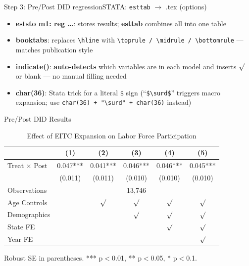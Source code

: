 \documentclass[dvipsnames,hyperref={pdfpagelabels=false}]{beamer}
\begin{document}
\begin{frame}{Step 3: Pre/Post DID regression}{STATA: \texttt{esttab} $\to$ .tex (options)}
\begin{itemize}
    \item \textbf{eststo m1: reg \ldots}: stores results; \textbf{esttab} combines all into one table
    \vspace{0.2cm}
    \item \textbf{booktabs}: replaces \texttt{\textbackslash hline} with
          \texttt{\textbackslash toprule / \textbackslash midrule / \textbackslash bottomrule}
          --- matches publication style
    \vspace{0.2cm}
    \item \textbf{indicate()}: \textbf{auto-detects} which variables are in each model
          and inserts $\surd$ or blank --- no manual filling needed
    \vspace{0.2cm}
    \item \textbf{char(36)}: Stata trick for a literal \texttt{\$} sign
          (``\texttt{\$\textbackslash surd\$}'' triggers macro expansion; use
          \texttt{char(36) + "\textbackslash surd" + char(36)} instead)
\end{itemize}
\end{frame}









\begin{frame}{Pre/Post DID Results}
\vspace{-0.2cm}
\begin{table}[h]
\centering
\footnotesize
\caption{Effect of EITC Expansion on Labor Force Participation}
\begin{tabular}{@{}lccccc@{}}
\toprule
 & (1) & (2) & (3) & (4) & (5) \\
\midrule\midrule
Treat $\times$ Post & 0.047*** & 0.041*** & 0.046*** & 0.046*** & 0.045*** \\
                   & (0.011)  & (0.011)  & (0.010)  & (0.010)  & (0.010)  \\
\midrule\midrule
Observations       & \multicolumn{5}{c}{13,746} \\
\midrule\midrule
Age Controls       &          & $\surd$  & $\surd$  & $\surd$  & $\surd$  \\
Demographics       &          &          & $\surd$  & $\surd$  & $\surd$  \\
State FE           &          &          &          & $\surd$  & $\surd$  \\
Year FE            &          &          &          &          & $\surd$  \\
\bottomrule
\end{tabular}
\end{table}
{\tiny Robust SE in parentheses. *** p$<$0.01, ** p$<$0.05, * p$<$0.1.}


\end{frame}
\end{document}
